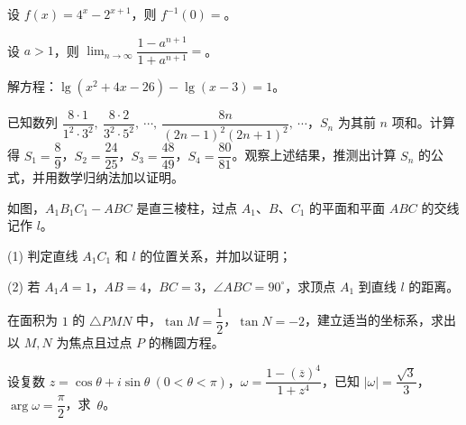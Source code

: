 \begin{question}
设 $f(x)=4^x-2^{x+1}$，则 $f^{-1}(0)=$\underline{\qquad\qquad}。

\end{question}
\begin{question}
设 $a>1$，则 $\displaystyle\lim_{n\to\infty}\dfrac{1-a^{n+1}}{1+a^{n+1}}=$\underline{\qquad\qquad}。

\end{question}
\begin{question}
解方程：$\lg(x^2+4x-26)-\lg(x-3)=1$。

\end{question}
\begin{question}
已知数列 $\dfrac{8\cdot1}{1^2\cdot3^2},\ \dfrac{8\cdot2}{3^2\cdot5^2},\ \cdots,\ \dfrac{8n}{(2n-1)^2(2n+1)^2},\ \cdots$，$S_n$ 为其前 $n$ 项和。计算得 $S_1=\dfrac89$，$S_2=\dfrac{24}{25}$，$S_3=\dfrac{48}{49}$，$S_4=\dfrac{80}{81}$。观察上述结果，推测出计算 $S_n$ 的公式，并用数学归纳法加以证明。

\Needspace{0.4\textheight}
\end{question}
\begin{question}
如图，$A_1B_1C_1-ABC$ 是直三棱柱，过点 $A_1\text{、}B\text{、}C_1$ 的平面和平面 $ABC$ 的交线记作 $l$。

(1) 判定直线 $A_1C_1$ 和 $l$ 的位置关系，并加以证明；

(2) 若 $A_1A=1$，$AB=4$，$BC=3$，$\angle ABC=90^\circ$，求顶点 $A_1$ 到直线 $l$ 的距离。
\nopagebreak[4]
\begin{center}\end{center}
\nopagebreak[4]
\end{question}
\begin{question}
在面积为 $1$ 的 $\triangle PMN$ 中，$\tan M=\dfrac12$，$\tan N=-2$，建立适当的坐标系，求出以 $M,N$ 为焦点且过点 $P$ 的椭圆方程。

\end{question}
\begin{question}
设复数 $z=\cos\theta+i\sin\theta\ (0<\theta<\pi)$，$\omega=\dfrac{1-(\overline z)^4}{1+z^4}$，已知 $|\omega|=\dfrac{\sqrt3}{3}$，$\arg\omega=\dfrac\pi2$，\mbox{求 $\theta$。}

\end{question}